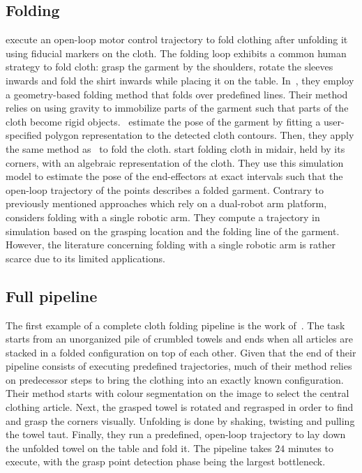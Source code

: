 \subsection{Folding}
\Textcite{Bersch2011} execute an open-loop motor control trajectory to fold clothing after unfolding it using fiducial markers on the cloth. The folding loop exhibits a common human strategy to fold cloth: grasp the garment by the shoulders, rotate the sleeves inwards and fold the shirt inwards while placing it on the table. In~\autocite{Berg2010}, they employ a geometry-based folding method that folds over predefined lines. Their method relies on using gravity to immobilize parts of the garment such that parts of the cloth become rigid objects.~\autocite{Miller2012} estimate the pose of the garment by fitting a user-specified polygon representation to the detected cloth contours. Then, they apply the same method as~\autocite{Berg2010} to fold the cloth. \Autocite{Yamakawa2011} start folding cloth in midair, held by its corners, with an algebraic representation of the cloth. They use this simulation model to estimate the pose of the end-effectors at exact intervals such that the open-loop trajectory of the points describes a folded garment. Contrary to previously mentioned approaches which rely on a dual-robot arm platform,~\autocite{Petrik2017} considers folding with a single robotic arm. They compute a trajectory in simulation based on the grasping location and the folding line of the garment. However, the literature concerning folding with a single robotic arm is rather scarce due to its limited applications.

\subsection{Full pipeline}
The first example of a complete cloth folding pipeline is the work of~\textcite{Maitin2010}. The task starts from an unorganized pile of crumbled towels and ends when all articles are stacked in a folded configuration on top of each other. Given that the end of their pipeline consists of executing predefined trajectories, much of their method relies on predecessor steps to bring the clothing into an exactly known configuration. Their method starts with colour segmentation on the image to select the central clothing article. Next, the grasped towel is rotated and regrasped in order to find and grasp the corners visually. Unfolding is done by shaking, twisting and pulling the towel taut. Finally, they run a predefined, open-loop trajectory to lay down the unfolded towel on the table and fold it. The pipeline takes $24$ minutes to execute, with the grasp point detection phase being the largest bottleneck.

